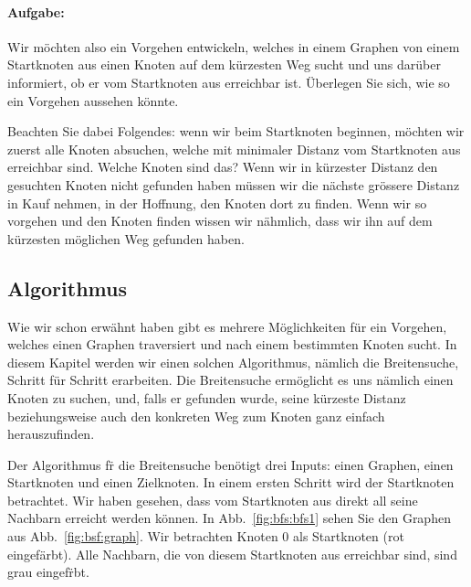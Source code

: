 \paragraph{Aufgabe:}Wir m\"ochten also ein Vorgehen entwickeln, welches in einem Graphen von einem Startknoten aus einen Knoten auf dem k\"urzesten Weg sucht und uns dar\"uber informiert, ob er vom Startknoten aus erreichbar ist. \"Uberlegen Sie sich, wie so ein Vorgehen aussehen k\"onnte.

Beachten Sie dabei Folgendes: wenn wir beim Startknoten beginnen, m\"ochten wir zuerst alle Knoten absuchen, welche mit minimaler Distanz vom Startknoten aus erreichbar sind. Welche Knoten sind das? Wenn wir in k\"urzester Distanz den gesuchten Knoten nicht gefunden haben m\"ussen wir die n\"achste gr\"ossere Distanz in Kauf nehmen, in der Hoffnung, den Knoten dort zu finden. Wenn wir so vorgehen und den Knoten finden wissen wir n\"ahmlich, dass wir ihn auf dem k\"urzesten m\"oglichen Weg gefunden haben.

\subsection{Algorithmus}

Wie wir schon erw\"ahnt haben gibt es mehrere M\"oglichkeiten f\"ur ein Vorgehen, welches einen Graphen traversiert und nach einem bestimmten Knoten sucht. In diesem Kapitel werden wir einen solchen Algorithmus,  n\"amlich die Breitensuche, Schritt f\"ur Schritt erarbeiten. Die Breitensuche erm\"oglicht es uns n\"amlich einen Knoten zu suchen, und, falls er gefunden wurde, seine k\"urzeste Distanz beziehungsweise auch den konkreten Weg zum Knoten ganz einfach herauszufinden.

Der Algorithmus f\"r die Breitensuche ben\"otigt drei Inputs: einen Graphen, einen Startknoten und einen Zielknoten. In einem ersten Schritt wird der Startknoten betrachtet. Wir haben gesehen, dass vom Startknoten aus direkt all seine Nachbarn erreicht werden k\"onnen. In Abb.~\ref{fig:bfs:bfs1} sehen Sie den Graphen aus Abb.~\ref{fig:bsf:graph}. Wir betrachten Knoten 0 als Startknoten (rot eingef\"arbt). Alle Nachbarn, die von diesem Startknoten aus erreichbar sind, sind grau eingef\"rbt.

